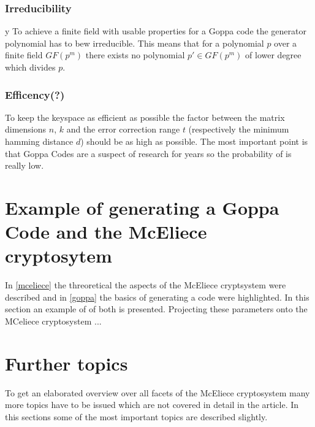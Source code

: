\subsubsection*{Irreducibility} 
y
To achieve a finite field with usable properties for a Goppa code the generator polynomial has to bew irreducible. This means that for a polynomial $p$ over a finite field $GF(p^m)$ there exists no polynomial $p' \in GF(p^m)$ of lower degree which divides $p$.
 

\subsubsection*{Efficency(?)} To keep the keyspace as efficient as possible the factor between the matrix dimensions $n$, $k$ and the error correction range $t$ (respectively the minimum hamming distance $d$) should be as high as possible. The most important point is that Goppa Codes are a suspect of research for years so the probability of is really low. 




\section{Example of generating a Goppa Code and the McEliece cryptosytem}
In \ref{mceliece} the threoretical the aspects of the McEliece cryptsystem were described and in \ref{goppa} the basics of generating a code were highlighted. In this section an example of of both is presented. 
Projecting these parameters onto the MCeliece cryptosystem ... 


\section{Further topics}
To get an elaborated overview over all facets of the McEliece cryptosystem many more topics have to be issued which are not covered in detail in the article. In this sections some of the most important topics are described slightly. 


